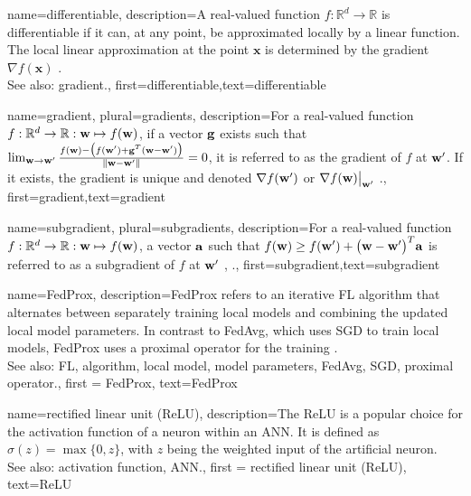 {name={differentiable},
	description={A real-valued function $f: \mathbb{R}^{d} \rightarrow \mathbb{R}$ 
		is differentiable if it can, at any point, be approximated locally by a linear 
		function. The local linear approximation at the point $\mathbf{x}$ is determined 
		by the gradient $\nabla f ( \mathbf{x})$ \cite{RudinBookPrinciplesMatheAnalysis}.
					\\ 
		See also: gradient.},
	first={differentiable},text={differentiable} 
}

{name={gradient}, plural={gradients},
	description={For a real-valued function 
	$f: \mathbb{R}^{d} \rightarrow \mathbb{R}: {\bf w} \mapsto f({\bf w})$, 
	if a vector ${\bf g}$ exists such that 
	$\lim_{{\bf w} \rightarrow {\bf w}'} \frac{f({\bf w}) - \big(f({\bf w}')+ {\bf g}^{T} ({\bf w}- {\bf w}') \big) }{\| {\bf w}-{\bf w}'\|}=0$, 
	it is referred to as the gradient of $f$ at ${\bf w}'$. If it exists, the gradient is unique and 
	denoted $\nabla f({\bf w}')$ or $\nabla f({\bf w})\big|_{{\bf w}'}$ \cite{RudinBookPrinciplesMatheAnalysis}.},
	first={gradient},text={gradient} 
}

{name={subgradient}, plural={subgradients},
description={For a real-valued function $f: \mathbb{R}^{d} \rightarrow \mathbb{R}: {\bf w} \mapsto f({\bf w})$, 
		a vector ${\bf a}$ such that $f({\bf w}) \geq  f({\bf w}') +\big({\bf w}-{\bf w}' \big)^{T} {\bf a}$ is 
		referred to as a subgradient of $f$ at ${\bf w}'$ \cite{BertCvxAnalOpt}, \cite{BertsekasNonLinProgr}.},
	first={subgradient},text={subgradient} 
}

{name={FedProx},
	description={FedProx refers to an iterative FL algorithm that alternates between separately training local models and combining the updated local model parameters. In contrast to FedAvg, which uses 
		SGD to train local models, FedProx uses a proximal operator for the training \cite{FedProx2020}.
					\\ 
		See also: FL, algorithm, local model, model parameters, FedAvg, SGD, proximal operator.}, 
	first = {FedProx}, text={FedProx} 
}

{name={rectified linear unit (ReLU)},
	description={The ReLU is 
		a popular choice for the activation function of a neuron within an ANN. It is defined 
		as $\sigma(z) = \max\{0,z\}$, with $z$ being the weighted input of the artificial 
		neuron.
					\\ 
		See also: activation function, ANN.}, first = {rectified linear unit (ReLU)}, text={ReLU} 
}

